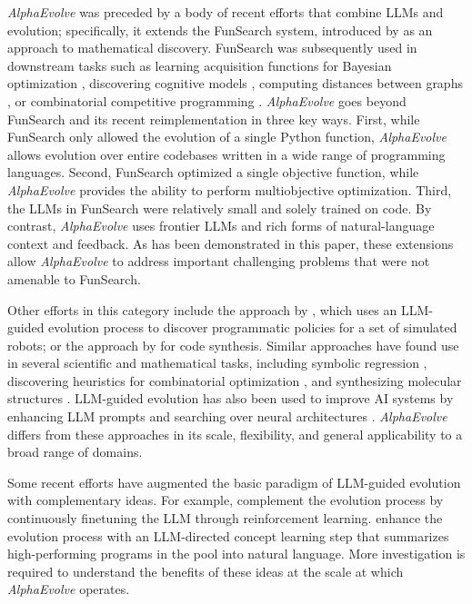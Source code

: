 \documentclass[logo,copyright,12pt]{googledeepmind}
\theoremstyle{definition}
\theoremstyle{remark}
\theoremstyle{plain}
\newcommand{\method}{\emph{AlphaEvolve}\xspace}
\begin{document}
\method was preceded by a body of recent efforts that combine LLMs and evolution; specifically, it extends the FunSearch system, introduced by \citet{paredes2023mathematical} as an approach to mathematical discovery.
FunSearch was subsequently used in downstream tasks such as learning acquisition functions for Bayesian optimization \citep{aglietti2025funbo}, discovering cognitive models \citep{castro2025discovering}, computing distances between graphs \citep{verma2025grail}, or combinatorial competitive programming \citep{velickovic2024amplifying}. 
\method goes beyond FunSearch and its recent reimplementation \citep{ellenberg2025generative} in three key ways.
First, while FunSearch only allowed the evolution of a single Python function, \method allows evolution over entire codebases written in a wide range of programming languages.
Second, FunSearch optimized a single objective function, while \method provides the ability to perform multiobjective optimization.
Third, the LLMs in FunSearch were relatively small and solely trained on code.
By contrast, \method uses frontier LLMs and rich forms of natural-language context and feedback.
As has been demonstrated in this paper, these extensions allow \method to address important challenging problems that were not amenable to FunSearch.

Other efforts in this category include the approach by \citet{lehman2023evolution}, which uses an LLM-guided evolution process to discover programmatic policies for a set of simulated robots; or the approach by \citet{hemberg2024evolving} for code synthesis.
Similar approaches have found use in several scientific and mathematical tasks, including symbolic regression \citep{shojaee2025llmsr,grayeli2024symbolic}, discovering heuristics for combinatorial optimization \citep{liu2024evolution,ye2024reevo,yao2025multiobjective}, and synthesizing molecular structures \citep{wang2025efficient}.
LLM-guided evolution has also been used to improve AI systems by enhancing LLM prompts \citep{fernando2023promptbreeder} and searching over neural architectures \citep{chen2023evoprompting,morris2024llm}.
\method differs from these approaches in its scale, flexibility, and general applicability to a broad range of domains.

Some recent efforts have augmented the basic paradigm of LLM-guided evolution with complementary ideas.
For example, \citet{surina2025algorithm} complement the evolution process by continuously finetuning the LLM through reinforcement learning.
\citet{grayeli2024symbolic} enhance the evolution process with an LLM-directed concept learning step that summarizes high-performing programs in the pool into natural language.
More investigation is required to understand the benefits of these ideas at the scale at which \method operates. 
\end{document}
